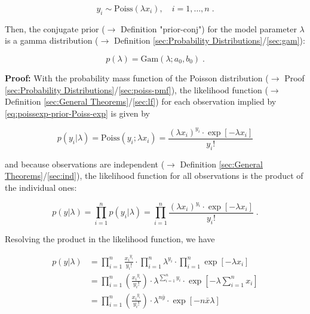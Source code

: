 \documentclass[a4paper,12pt,twoside]{book}
\begin{document}
\begin{equation} \label{eq:poissexp-prior-Poiss-exp}
y_i \sim \mathrm{Poiss}(\lambda x_i), \quad i = 1, \ldots, n \; .
\end{equation}

Then, the conjugate prior ($\rightarrow$ Definition "prior-conj") for the model parameter $\lambda$ is a gamma distribution ($\rightarrow$ Definition \ref{sec:Probability Distributions}/\ref{sec:gam}):

\begin{equation} \label{eq:poissexp-prior-Poiss-exp-prior}
p(\lambda) = \mathrm{Gam}(\lambda; a_0, b_0) \; .
\end{equation}


\vspace{1em}
\textbf{Proof:} With the probability mass function of the Poisson distribution ($\rightarrow$ Proof \ref{sec:Probability Distributions}/\ref{sec:poiss-pmf}), the likelihood function ($\rightarrow$ Definition \ref{sec:General Theorems}/\ref{sec:lf}) for each observation implied by \eqref{eq:poissexp-prior-Poiss-exp} is given by

\begin{equation} \label{eq:poissexp-prior-Poiss-exp-LF-s1}
p(y_i|\lambda) = \mathrm{Poiss}(y_i; \lambda x_i) = \frac{(\lambda x_i)^{y_i} \cdot \exp\left[-\lambda x_i\right]}{y_i !}
\end{equation}

and because observations are independent ($\rightarrow$ Definition \ref{sec:General Theorems}/\ref{sec:ind}), the likelihood function for all observations is the product of the individual ones:

\begin{equation} \label{eq:poissexp-prior-Poiss-exp-LF-s2}
p(y|\lambda) = \prod_{i=1}^n p(y_i|\lambda) = \prod_{i=1}^n \frac{(\lambda x_i)^{y_i} \cdot \exp\left[-\lambda x_i\right]}{y_i !} \; .
\end{equation}

Resolving the product in the likelihood function, we have

\begin{equation} \label{eq:poissexp-prior-Poiss-exp-LF-s3}
\begin{split}
p(y|\lambda) &= \prod_{i=1}^n \frac{ {x_i}^{y_i}}{y_i !} \cdot \prod_{i=1}^n \lambda^{y_i} \cdot \prod_{i=1}^n \exp\left[-\lambda x_i\right] \\
&= \prod_{i=1}^n \left(\frac{ {x_i}^{y_i}}{y_i !}\right) \cdot \lambda^{\sum_{i=1}^n y_i} \cdot \exp\left[-\lambda \sum_{i=1}^n x_i\right] \\
&= \prod_{i=1}^n \left(\frac{ {x_i}^{y_i}}{y_i !}\right) \cdot \lambda^{n \bar{y}} \cdot \exp\left[-n \bar{x} \lambda\right]
\end{split}
\end{equation}
\end{document}
